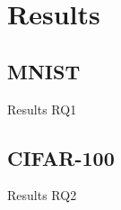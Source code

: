 \section{Results}
\label{sec:results}

\subsection{MNIST}
\label{sec:results_mnist}
Results RQ1

\subsection{CIFAR-100}
\label{sec:results_cifar}
Results RQ2
